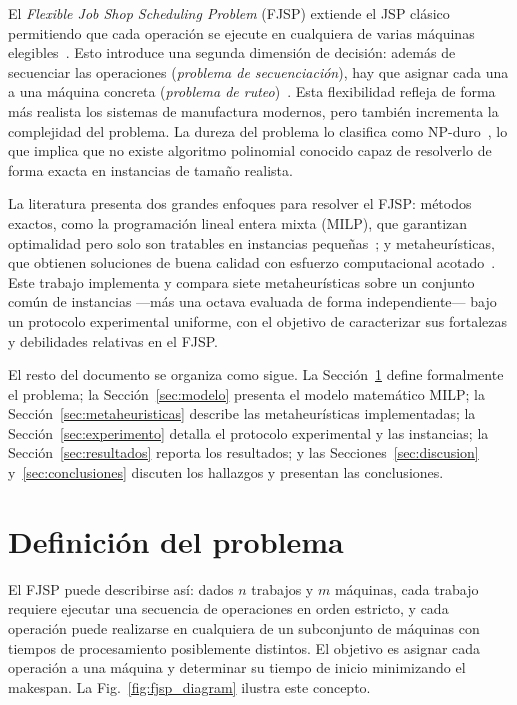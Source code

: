 \documentclass[conference]{IEEEtran}
\begin{document}
El \emph{Flexible Job Shop Scheduling Problem} (FJSP) extiende el
JSP cl\'asico permitiendo que cada operaci\'on se ejecute en
cualquiera de varias m\'aquinas elegibles~\cite{hurink1994}.
Esto introduce una segunda dimensi\'on de decisi\'on: adem\'as de
secuenciar las operaciones (\emph{problema de secuenciaci\'on}),
hay que asignar cada una a una m\'aquina concreta (\emph{problema
de ruteo})~\cite{dauzere1997}.
Esta flexibilidad refleja de forma m\'as realista los sistemas de
manufactura modernos, pero tambi\'en incrementa la complejidad del
problema. La dureza del problema lo clasifica como
NP-duro~\cite{garey1976}, lo que implica que no existe algoritmo
polinomial conocido capaz de resolverlo de forma exacta en
instancias de tama\~no realista.

La literatura presenta dos grandes enfoques para resolver el FJSP:
m\'etodos exactos, como la programaci\'on lineal entera mixta
(MILP), que garantizan optimalidad pero solo son tratables en
instancias peque\~nas~\cite{garey1979}; y metaheur\'isticas, que
obtienen soluciones de buena calidad con esfuerzo computacional
acotado~\cite{mastrolilli2000}.
Este trabajo implementa y compara siete metaheur\'isticas sobre un
conjunto com\'un de instancias ---m\'as una octava evaluada de forma
independiente--- bajo un protocolo experimental uniforme, con el
objetivo de caracterizar sus fortalezas y debilidades relativas en
el FJSP.

El resto del documento se organiza como sigue. La
Secci\'on~\ref{sec:definicion} define formalmente el problema; la
Secci\'on~\ref{sec:modelo} presenta el modelo matem\'atico MILP; la
Secci\'on~\ref{sec:metaheuristicas} describe las metaheur\'isticas
implementadas; la Secci\'on~\ref{sec:experimento} detalla el
protocolo experimental y las instancias; la
Secci\'on~\ref{sec:resultados} reporta los resultados; y las
Secciones~\ref{sec:discusion} y~\ref{sec:conclusiones} discuten los
hallazgos y presentan las conclusiones.

\section{Definici\'on del problema}
\label{sec:definicion}

El FJSP puede describirse as\'i: dados $n$ trabajos y $m$
m\'aquinas, cada trabajo requiere ejecutar una secuencia de
operaciones en orden estricto, y cada operaci\'on puede realizarse
en cualquiera de un subconjunto de m\'aquinas con tiempos de
procesamiento posiblemente distintos.
El objetivo es asignar cada operaci\'on a una m\'aquina y
determinar su tiempo de inicio minimizando el makespan.
La Fig.~\ref{fig:fjsp_diagram} ilustra este concepto.
\end{document}
